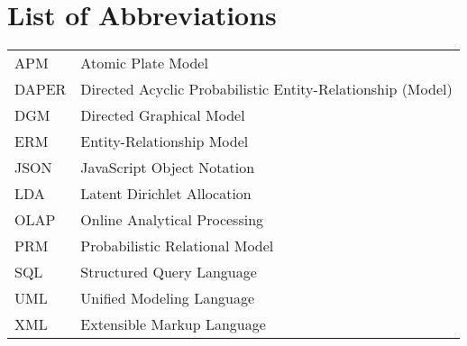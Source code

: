 \section*{List of Abbreviations}

\begin{tabular}{ll}
APM & Atomic Plate Model\\
DAPER & Directed Acyclic Probabilistic Entity-Relationship (Model)\\
DGM & Directed Graphical Model\\
ERM & Entity-Relationship Model\\
JSON & JavaScript Object Notation\\
LDA & Latent Dirichlet Allocation\\
OLAP & Online Analytical Processing\\
PRM & Probabilistic Relational Model\\
SQL & Structured Query Language\\
UML & Unified Modeling Language\\
XML & Extensible Markup Language

\end{tabular}